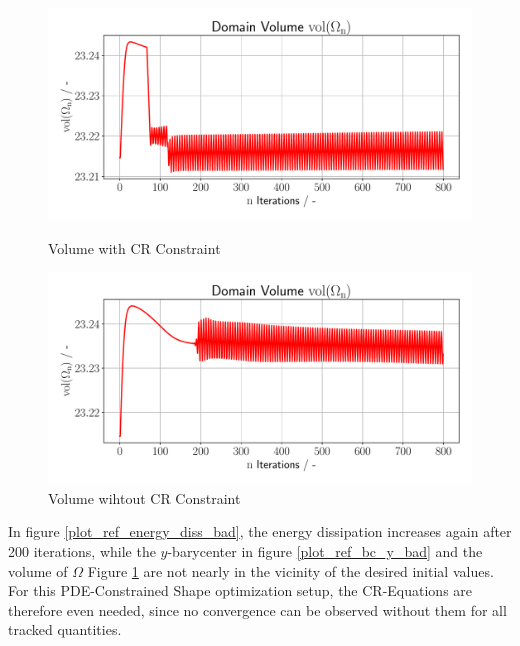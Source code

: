 \begin{figure}[h]
    \begin{minipage}{.5\textwidth}
        \centering
        \includegraphics[width=1\textwidth]{figures/volume_plot.pdf}
        \caption{Volume with CR Constraint}
        \label{plot_ref_vol_good}
    \end{minipage}
    \begin{minipage}{.5\textwidth}
        \centering
        \includegraphics[width=1\textwidth]{figures/volume_plot_bad.pdf}
        \caption{Volume wihtout CR Constraint}
        \label{plot_ref_vol_bad}
    \end{minipage}
\end{figure}

In figure \ref{plot_ref_energy_diss_bad}, the energy dissipation increases again after 200 iterations,
while the $y$-barycenter in figure \ref{plot_ref_bc_y_bad} and the volume of $\Omega$ 
Figure \ref{plot_ref_vol_bad} are not nearly in the vicinity of the desired initial values.
For this PDE-Constrained Shape optimization setup, the CR-Equations are therefore even needed,
since no convergence can be observed without them for all tracked quantities.

\pagebreak